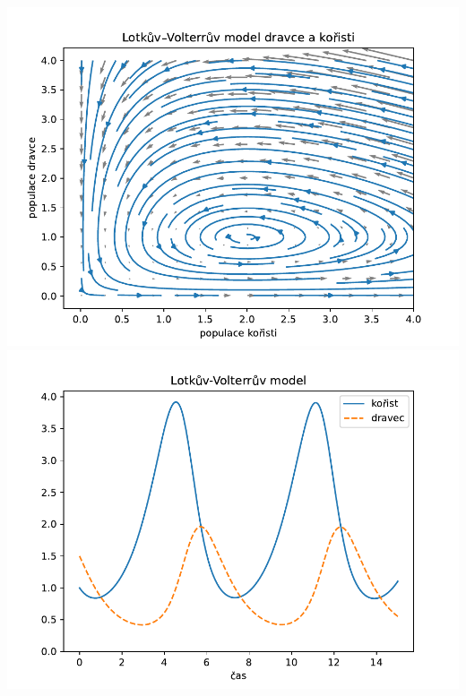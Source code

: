 \documentclass{article}
\begin{document}
\includegraphics[width=0.5\hsize]{Lotka-Volterra_portret.pdf}
\includegraphics[width=0.5\hsize]{Lotka-Volterra_prubeh.pdf}
\end{document}
